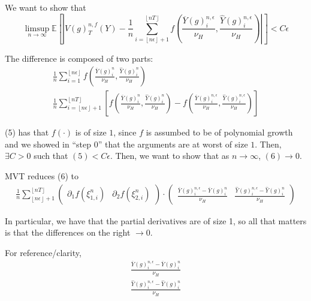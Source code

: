 \documentclass[12pt,letterpaper]{article}
\theoremstyle{definition}
\newcommand{\E}{\mathbb{E}}
\begin{document}
We want to show that
\[
  \limsup_{n \rightarrow \infty} \E \left[ \left| V(g)^{n,f}_T(Y) - \frac{1}{n}\sum_{i=\left\lfloor n\epsilon \right\rfloor + 1}^{\left\lfloor nT \right\rfloor} f\left( \frac{\overline{Y}(g)^{n,\epsilon}_i}{\nu_H}, \frac{\widehat{Y}(g)^{n,\epsilon}_i}{\nu_H} \right) \right| \right] < C\epsilon
\]

The difference is composed of two parts:
\begin{gather}
  \frac{1}{n}\sum_{i=1}^{\left\lfloor n\epsilon \right\rfloor} f\left( \frac{\overline{Y}(g)^n_i}{\nu_H}, \frac{\widehat{Y}(g)^n_i}{\nu_H} \right) \\
  \frac{1}{n}\sum_{i=\left\lfloor n\epsilon \right\rfloor + 1}^{\left\lfloor nT \right\rfloor}\left[ f\left( \frac{\overline{Y}(g)^{n}_i}{\nu_H}, \frac{\widehat{Y}(g)^{n}_i}{\nu_H} \right) -  f\left( \frac{\overline{Y}(g)^{n,\epsilon}_i}{\nu_H}, \frac{\widehat{Y}(g)^{n,\epsilon}_i}{\nu_H} \right) \right]
\end{gather}

(5) has that \(f(\cdot)\) is of size \(1\), since \(f\) is assumbed to be of polynomial growth and we showed in ``step 0'' that the arguments are at worst of size \(1\). Then, \(\exists C > 0\) such that \((5) < C\epsilon\). Then, we want to show that as \(n \rightarrow \infty\), \((6) \rightarrow 0\).

MVT reduces (6) to
\begin{gather}
  \frac{1}{n}\sum_{\left\lfloor n\epsilon \right\rfloor + 1}^{\left\lfloor nT \right\rfloor} \begin{pmatrix} \partial_1 f(\xi_{1,i}^n) & \partial_2 f(\xi_{2,i}^n) \end{pmatrix} \cdot \begin{pmatrix} \frac{\overline{Y}(g)^{n,\epsilon}_i - \overline{Y}(g)^{n}_i}{\nu_H} & \frac{\widehat{Y}(g)^{n,\epsilon}_i - \widehat{Y}(g)^{n}_i}{\nu_H} \end{pmatrix}
\end{gather}

In particular, we have that the partial derivatives are of size 1, so all that matters is that the differences on the right \(\rightarrow 0\).

For reference/clarity,
\begin{gather}
  \frac{\overline{Y}(g)^{n,\epsilon}_i - \overline{Y}(g)^{n}_i}{\nu_H} \\
  \frac{\widehat{Y}(g)^{n,\epsilon}_i - \widehat{Y}(g)^{n}_i}{\nu_H}
\end{gather}
\end{document}
